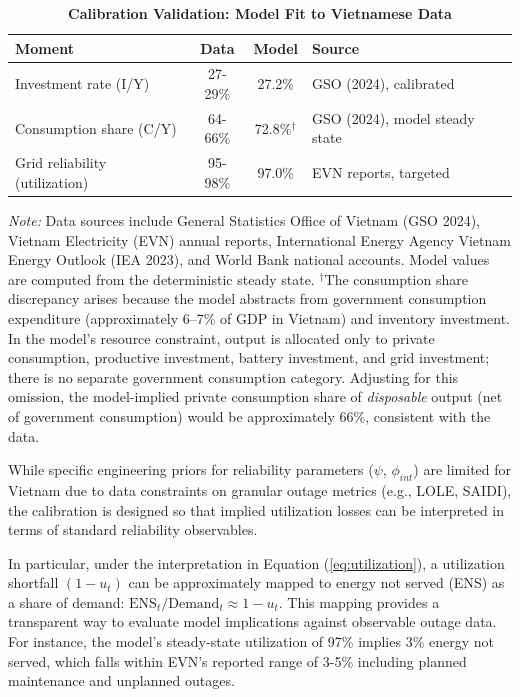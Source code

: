 \documentclass[12pt, a4paper]{article}
\begin{document}
\begin{table}[H]
    \centering
    \caption{\textbf{Calibration Validation: Model Fit to Vietnamese Data}}
    \label{tab:validation}
    \renewcommand{\arraystretch}{1.3}
    \begin{tabular}{l c c l}
        \toprule
        \textbf{Moment} & \textbf{Data} & \textbf{Model} & \textbf{Source} \\
        \midrule
        Investment rate (I/Y) & 27-29\% & 27.2\% & GSO (2024), calibrated \\
        Consumption share (C/Y) & 64-66\% & 72.8\%$^{\dagger}$ & GSO (2024), model steady state \\
        Grid reliability (utilization) & 95-98\% & 97.0\% & EVN reports, targeted \\
        \bottomrule
    \end{tabular}
    \vspace{0.2cm}
    \parbox{\textwidth}{\footnotesize \textit{Note:} Data sources include General Statistics Office of Vietnam (GSO 2024), Vietnam Electricity (EVN) annual reports, International Energy Agency Vietnam Energy Outlook (IEA 2023), and World Bank national accounts. Model values are computed from the deterministic steady state. $^{\dagger}$The consumption share discrepancy arises because the model abstracts from government consumption expenditure (approximately 6--7\% of GDP in Vietnam) and inventory investment. In the model's resource constraint, output is allocated only to private consumption, productive investment, battery investment, and grid investment; there is no separate government consumption category. Adjusting for this omission, the model-implied private consumption share of \textit{disposable} output (net of government consumption) would be approximately 66\%, consistent with the data.}
\end{table}

While specific engineering priors for reliability parameters ($\psi$, $\phi_{int}$) are limited for Vietnam due to data constraints on granular outage metrics (e.g., LOLE, SAIDI), the calibration is designed so that implied utilization losses can be interpreted in terms of standard reliability observables.

In particular, under the interpretation in Equation (\ref{eq:utilization}), a utilization shortfall $(1-u_t)$ can be approximately mapped to energy not served (ENS) as a share of demand: $\text{ENS}_t/\text{Demand}_t \approx 1-u_t$. This mapping provides a transparent way to evaluate model implications against observable outage data. For instance, the model's steady-state utilization of 97\% implies 3\% energy not served, which falls within EVN's reported range of 3-5\% including planned maintenance and unplanned outages.
\end{document}
